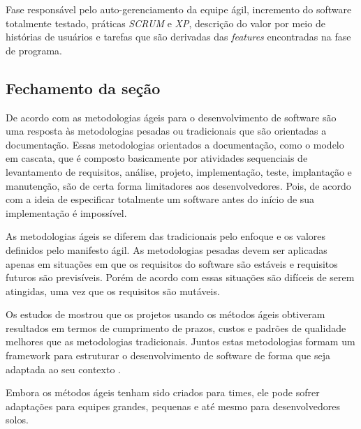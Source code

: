 Fase responsável pelo auto-gerenciamento da equipe ágil, incremento do software totalmente testado, práticas \textit{SCRUM} e \textit{XP}, descrição do valor por meio de histórias de usuários e tarefas que são derivadas das \textit{features} encontradas na fase de programa.


\subsection{Fechamento da seção}

De acordo com \cite{soares} as metodologias ágeis para o desenvolvimento de software são uma resposta às metodologias pesadas ou tradicionais que são orientadas a documentação. Essas metodologias orientados a documentação, como o modelo em cascata, que é composto basicamente por atividades sequenciais de levantamento de requisitos, análise, projeto, implementação, teste, implantação e manutenção, são de certa forma limitadores aos desenvolvedores. Pois, de acordo com \cite{brooks} a ideia de especificar totalmente um software antes do início de sua implementação é impossível.

As metodologias ágeis se diferem das tradicionais pelo enfoque e os valores definidos pelo manifesto ágil. As metodologias pesadas devem ser aplicadas apenas em situações em que os requisitos do software são estáveis e requisitos futuros são previsíveis. Porém de acordo com \cite{soares} essas situações são difíceis de serem atingidas, uma vez que os requisitos são mutáveis.

Os estudos de \cite{charette} mostrou que os projetos usando os métodos ágeis obtiveram resultados em termos de cumprimento de prazos, custos e padrões de qualidade melhores que as metodologias tradicionais. Juntos estas metodologias formam um framework para estruturar o desenvolvimento de software de forma que seja adaptada ao seu contexto \cite{soares}.

Embora os métodos ágeis tenham sido criados para times, ele pode sofrer adaptações para equipes grandes, pequenas e até mesmo para desenvolvedores solos. \cite{soares}
